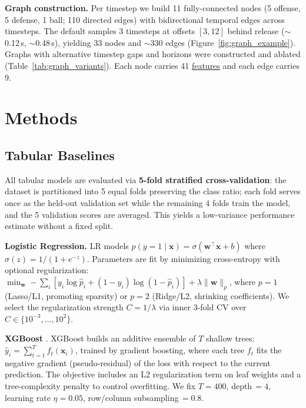 \documentclass{article}
\begin{document}
\textbf{Graph construction.} Per timestep we build 11 fully-connected nodes (5 offense, 5 defense, 1 ball; 110 directed edges) with bidirectional temporal edges across timesteps. The default samples 3 timesteps at offsets $[3, 12]$ behind release (${\sim}$0.12\,s, ${\sim}$0.48\,s), yielding 33 nodes and ${\sim}$330 edges (Figure~\ref{fig:graph_example}). Graphs with alternative timestep gaps and horizons were constructed and ablated (Table~\ref{tab:graph_variants}). Each node carries 41 \hyperlink{app:features}{features} and each edge carries 9.

\section{Methods}

\subsection{Tabular Baselines}

All tabular models are evaluated via \textbf{5-fold stratified cross-validation}: the dataset is partitioned into 5 equal folds preserving the class ratio; each fold serves once as the held-out validation set while the remaining 4 folds train the model, and the 5 validation scores are averaged. This yields a low-variance performance estimate without a fixed split.

\textbf{Logistic Regression.}
LR models $p(y\!=\!1 \mid \mathbf{x}) = \sigma(\mathbf{w}^\top\mathbf{x} + b)$ where $\sigma(z) = 1/(1+e^{-z})$. Parameters are fit by minimizing cross-entropy with optional regularization:
$\min_{\mathbf{w}} -\!\sum_i [y_i \log \hat{p}_i + (1\!-\!y_i)\log(1\!-\!\hat{p}_i)] + \lambda \|\mathbf{w}\|_p$,
where $p\!=\!1$ (Lasso/L1, promoting sparsity) or $p\!=\!2$ (Ridge/L2, shrinking coefficients). We select the regularization strength $C = 1/\lambda$ via inner 3-fold CV over $C \in \{10^{-3}, \ldots, 10^2\}$.

\textbf{XGBoost} \citep{chen2016xgboost}.
XGBoost builds an additive ensemble of $T$ shallow trees: $\hat{y}_i = \sum_{t=1}^T f_t(\mathbf{x}_i)$, trained by gradient boosting, where each tree $f_t$ fits the negative gradient (pseudo-residual) of the loss with respect to the current prediction. The objective includes an L2 regularization term on leaf weights and a tree-complexity penalty to control overfitting. We fix $T\!=\!400$, depth$\,=\!4$, learning rate $\eta\!=\!0.05$, row/column subsampling$\,=\!0.8$.
\end{document}
